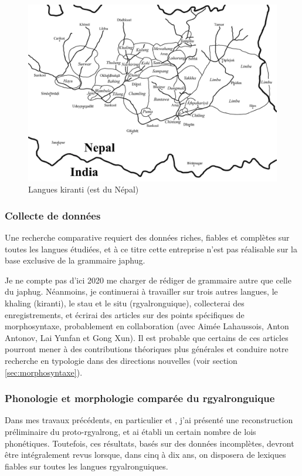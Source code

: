 \documentclass[oldfontcommands,oneside,a4paper,11pt]{article}
\begin{document}
 \begin{figure}[h]
   \caption{Langues kiranti (est du Népal)} \label{fig:kirant}   \centering
  \includegraphics[width=\textwidth]{Kirant.jpeg} 
 \end{figure}
 
\subsubsection{Collecte de données}
Une recherche comparative requiert des données riches, fiables et complètes sur toutes les langues étudiées, et à ce titre cette entreprise n'est pas réalisable sur la base exclusive de la grammaire japhug.

Je ne compte pas d'ici 2020 me charger de rédiger de grammaire autre que celle du japhug. Néanmoins, je continuerai à travailler sur trois autres langues, le khaling (kiranti), le stau et le situ (rgyalronguique), collecterai des enregistrements, et écrirai des articles sur des points spécifiques de morphosyntaxe, probablement en collaboration (avec Aimée Lahaussois, Anton Antonov, Lai Yunfan et Gong Xun). Il est probable que certains de ces articles pourront mener à des contributions théoriques plus générales et conduire notre recherche en typologie dans des directions nouvelles (voir section \ref{sec:morphosyntaxe}).


\subsubsection{Phonologie et morphologie comparée du rgyalronguique} \label{sec:comparee.rgy}
Dans mes travaux précédents, en particulier \citet{jacques04these} et \citet{jacques14esquisse}, j'ai présenté une reconstruction préliminaire du proto-rgyalrong, et ai établi un certain nombre de lois phonétiques. Toutefois, ces résultats, basés sur des données incomplètes, devront être intégralement revus lorsque, dans cinq à dix ans, on disposera de lexiques fiables sur toutes les langues rgyalronguiques.
\end{document}
